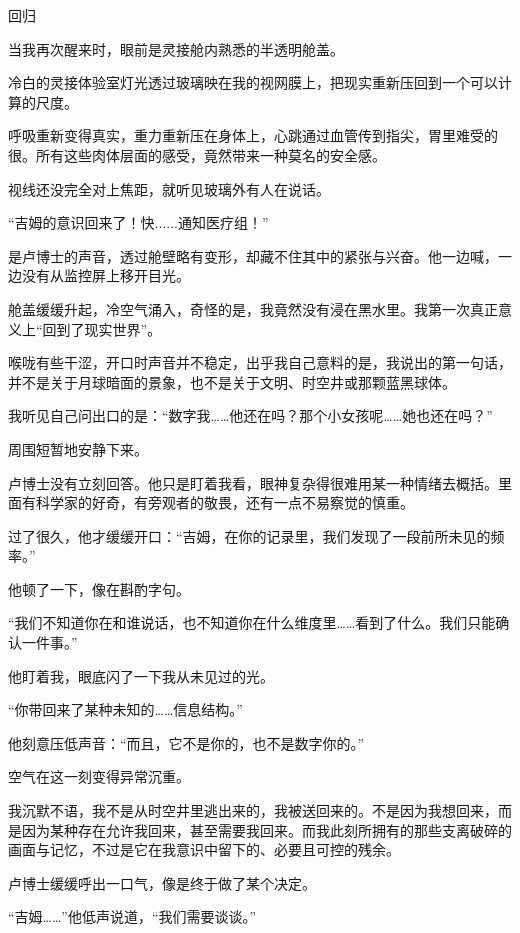 回归

当我再次醒来时，眼前是灵接舱内熟悉的半透明舱盖。

冷白的灵接体验室灯光透过玻璃映在我的视网膜上，把现实重新压回到一个可以计算的尺度。

呼吸重新变得真实，重力重新压在身体上，心跳通过血管传到指尖，胃里难受的很。所有这些肉体层面的感受，竟然带来一种莫名的安全感。

视线还没完全对上焦距，就听见玻璃外有人在说话。

“吉姆的意识回来了！快......通知医疗组！”

是卢博士的声音，透过舱壁略有变形，却藏不住其中的紧张与兴奋。他一边喊，一边没有从监控屏上移开目光。

舱盖缓缓升起，冷空气涌入，奇怪的是，我竟然没有浸在黑水里。我第一次真正意义上“回到了现实世界”。

喉咙有些干涩，开口时声音并不稳定，出乎我自己意料的是，我说出的第一句话，并不是关于月球暗面的景象，也不是关于文明、时空井或那颗蓝黑球体。

我听见自己问出口的是：“数字我……他还在吗？那个小女孩呢……她也还在吗？”

周围短暂地安静下来。

卢博士没有立刻回答。他只是盯着我看，眼神复杂得很难用某一种情绪去概括。里面有科学家的好奇，有旁观者的敬畏，还有一点不易察觉的慎重。

过了很久，他才缓缓开口：“吉姆，在你的记录里，我们发现了一段前所未见的频率。”

他顿了一下，像在斟酌字句。

“我们不知道你在和谁说话，也不知道你在什么维度里……看到了什么。我们只能确认一件事。”

他盯着我，眼底闪了一下我从未见过的光。

“你带回来了某种未知的……信息结构。”

他刻意压低声音：“而且，它不是你的，也不是数字你的。”

空气在这一刻变得异常沉重。

我沉默不语，我不是从时空井里逃出来的，我被送回来的。不是因为我想回来，而是因为某种存在允许我回来，甚至需要我回来。而我此刻所拥有的那些支离破碎的画面与记忆，不过是它在我意识中留下的、必要且可控的残余。

卢博士缓缓呼出一口气，像是终于做了某个决定。

“吉姆……”他低声说道，“我们需要谈谈。”
